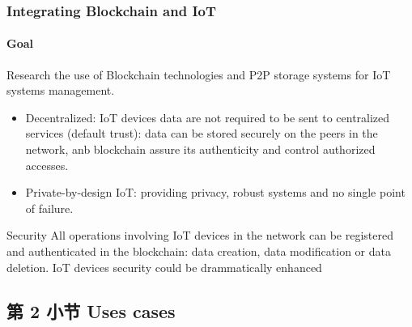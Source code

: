 \documentclass[
    aspectratio=169,                   %
]{beamer}
\begin{document}
    \begin{frame}
        \frametitle{Integrating Blockchain and IoT}

        \paragraph{Goal} Research the use of \alert{Blockchain technologies} and \alert{P2P storage systems} for IoT systems management.

        \begin{itemize}
            \item \alert{Decentralized}: IoT devices data are not required to be sent to centralized services (default trust): data can be stored securely on the peers in the network, anb blockchain assure its authenticity and control authorized accesses.
            \item \alert{Private-by-design IoT}: providing privacy, robust systems and no single point of failure.
        \end{itemize}

        \begin{block}{Security}
            All operations involving IoT devices in the network can be registered and authenticated in the blockchain: data creation, data modification or data deletion. IoT devices security could be drammatically enhanced
        \end{block}

    \end{frame}

\subsection{第 2 小节 Uses cases}
\end{document}

